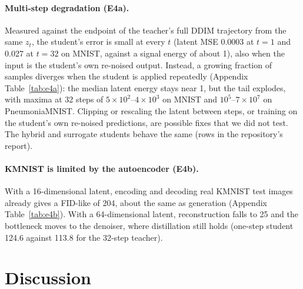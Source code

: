\documentclass[11pt]{article}
\newcommand{\fidlike}{FID-like}
\begin{document}
\paragraph{Multi-step degradation (E4a).} Measured against the endpoint of the
teacher's full DDIM trajectory from the same $z_t$, the student's error is small
at every $t$ (latent MSE 0.0003 at $t=1$ and 0.027 at $t=32$ on MNIST, against a
signal energy of about 1), also when the input is the student's own re-noised
output. Instead, a growing fraction of samples diverges when the student is applied
repeatedly (Appendix Table~\ref{tab:e4a}): the median latent energy stays near 1,
but the tail explodes, with maxima at 32 steps of $5\times10^2$--$4\times10^3$ on
MNIST and $10^5$--$7\times10^7$ on PneumoniaMNIST. Clipping or rescaling the latent
between steps, or training on the student's own re-noised predictions, are possible
fixes that we did not test. The hybrid and surrogate students behave the same (rows
in the repository's report).

\paragraph{KMNIST is limited by the autoencoder (E4b).} With a 16-dimensional
latent, encoding and decoding real KMNIST test images already gives a \fidlike{} of
204, about the same as generation (Appendix Table~\ref{tab:e4b}). With a
64-dimensional latent, reconstruction falls to 25 and the bottleneck moves to the
denoiser, where distillation still holds (one-step student 124.6 against 113.8 for
the 32-step teacher).

\section{Discussion}
\label{sec:discussion}
\end{document}
